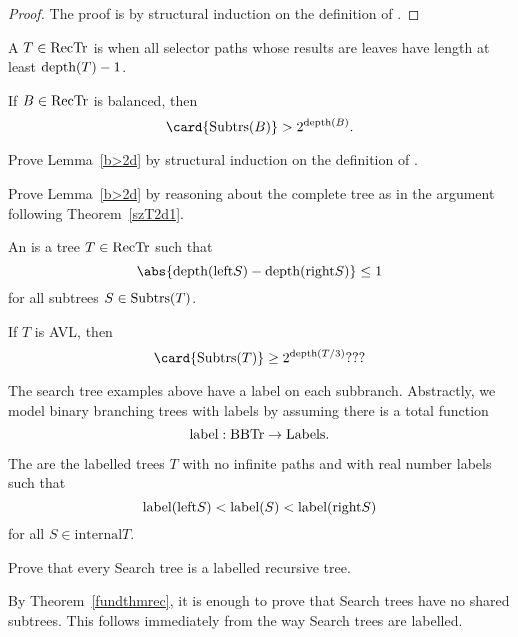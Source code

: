 \begin{proof}
The proof is by structural induction on the definition of \rectr.

\end{proof} 

A $T \in \text{RecTr}$ is  when all selector paths whose
results are leaves have length at least $\text{depth}(T) -1$.

\begin{lemma}\label{b>2d}
If $B \in \text{RecTr}$ is balanced, then
\[
\card{\subbrn{B}} > 2^{\text{depth}(B)}.
\]
\end{lemma}

\begin{problem}
Prove Lemma~\ref{b>2d} by structural induction on the definition of \rectr.

\begin{solution}
\end{solution}
\end{problem}

\begin{problem}
Prove Lemma~\ref{b>2d} by reasoning about the complete tree as in the
argument following Theorem~\ref{szT2d1}.

\begin{solution}
\end{solution}
\end{problem}

An  is a tree $T\in \text{RecTr}$ such that
\[
\abs{\trdpth{\leftsub{S}} - \trdpth{\rightsub{S}}} \leq 1
\]
for all subtrees $S \in \text{Subtrs}(T)$.

\begin{lemma}\label{}
If $T$ is AVL, then
\[
\card{\subbrn{T}} \geq 2^{\text{depth}(T/3)}???
\]
\end{lemma}

The search tree examples above have a label on each subbranch.
Abstractly, we model binary branching trees with labels by assuming
there is a total function
\[
\text{label}:\text{BBTr} \to \text{Labels}.
\]

\begin{definition}
The  are the labelled trees $T$ with no infinite
paths and with real number labels such that
\[
\text{label}(\text{left}S) < \text{label}(S) < \text{label}(\text{right}S)
\]
for all $S \in \text{internal}{T}$.
\end{definition}

\begin{problem}
Prove that every Search tree is a labelled recursive tree.

\begin{solution}
By Theorem~\ref{fundthmrec}, it is enough to prove that Search trees
have no shared subtrees.  This follows immediately from the way Search
trees are labelled.
\end{solution}
\end{problem}

